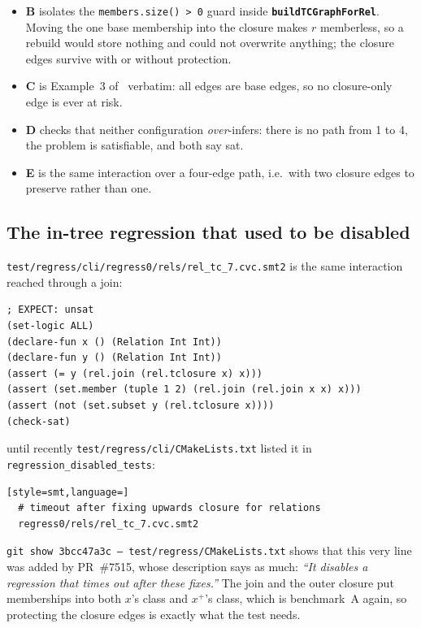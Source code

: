 \documentclass[11pt,a4paper]{article}
\newcommand{\code}[1]{\texttt{\small #1}}
\newcommand{\fn}[1]{\texttt{\small\bfseries #1}}
\newcommand{\file}[1]{\texttt{\small #1}}
\newcommand{\tc}[1]{{#1}^{+}}
\theoremstyle{definition}
\begin{document}
\begin{itemize}[leftmargin=*,itemsep=1pt]
\item \textbf{B} isolates the \code{members.size() > 0} guard inside
  \fn{buildTCGraphForRel}. Moving the one base membership into the closure makes
  $r$ memberless, so a rebuild would store nothing and could not overwrite
  anything; the closure edges survive with or without protection.
\item \textbf{C} is Example~3 of~\cite{MRT17} verbatim: all edges are base
  edges, so no closure-only edge is ever at risk.
\item \textbf{D} checks that neither configuration \emph{over}-infers: there is
  no path from 1 to 4, the problem is satisfiable, and both say \textsf{sat}.
\item \textbf{E} is the same interaction over a four-edge path, i.e.\ with two
  closure edges to preserve rather than one.
\end{itemize}

\subsection{The in-tree regression that used to be disabled}
\label{sec:reltc7}

\file{test/regress/cli/\allowbreak{}regress0/rels/\allowbreak{}rel\_tc\_7.cvc.smt2}
is the same interaction reached through a join:

\begin{lstlisting}[style=smt]
; EXPECT: unsat
(set-logic ALL)
(declare-fun x () (Relation Int Int))
(declare-fun y () (Relation Int Int))
(assert (= y (rel.join (rel.tclosure x) x)))
(assert (set.member (tuple 1 2) (rel.join (rel.join x x) x)))
(assert (not (set.subset y (rel.tclosure x))))
(check-sat)
\end{lstlisting}

\noindent
until recently \file{test/regress/cli/CMakeLists.txt} listed it in
\code{regression\_disabled\_tests}:

\begin{lstlisting}[style=smt,language=]
  # timeout after fixing upwards closure for relations
  regress0/rels/rel_tc_7.cvc.smt2
\end{lstlisting}

\noindent
\code{git show 3bcc47a3c -- test/regress/CMakeLists.txt} shows that this very
line was added by PR~\#7515, whose description says as much: \emph{``It disables
a regression that times out after these fixes.''} The join and the outer closure
put memberships into both $x$'s class and $\tc{x}$'s class, which is benchmark~A
again, so protecting the closure edges is exactly what the test needs.
\end{document}
